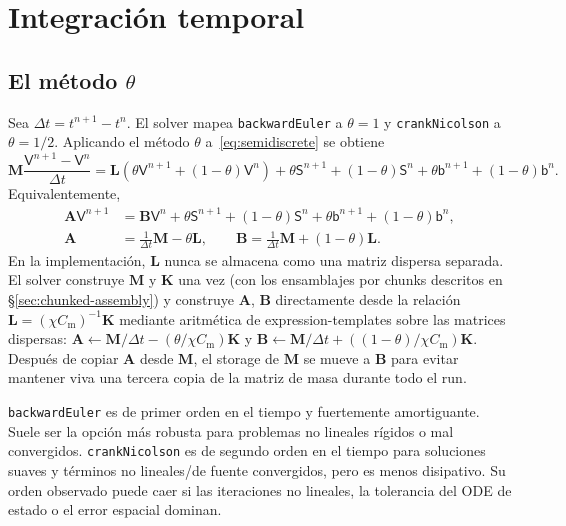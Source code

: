\documentclass[11pt,a4paper]{article}
\newcommand{\code}[1]{\texttt{\small #1}}
\newcommand{\Mmass}{\mathbf{M}}
\newcommand{\Kstif}{\mathbf{K}}
\newcommand{\Lop}{\mathbf{L}}
\newcommand{\Aimp}{\mathbf{A}}
\newcommand{\Bimp}{\mathbf{B}}
\begin{document}
\section{Integración temporal}

\subsection{El método \texorpdfstring{$\theta$}{theta}}

Sea $\Delta t=t^{n+1}-t^n$. El solver mapea \code{backwardEuler} a $\theta=1$ y
\code{crankNicolson} a $\theta=1/2$. Aplicando el método $\theta$ a~\eqref{eq:semidiscrete}
se obtiene
\begin{equation}
  \Mmass\frac{\mathsf{V}^{n+1}-\mathsf{V}^{n}}{\Delta t}
  =
  \Lop\left(\theta\mathsf{V}^{n+1}+(1-\theta)\mathsf{V}^{n}\right)
  +
  \theta\mathsf{S}^{n+1}
  +(1-\theta)\mathsf{S}^{n}
  +\theta\mathsf{b}^{n+1}
  +(1-\theta)\mathsf{b}^{n}.
  \label{eq:theta}
\end{equation}
Equivalentemente,
\begin{align}
  \Aimp \mathsf{V}^{n+1}
  &=
  \Bimp \mathsf{V}^{n}
  +\theta\mathsf{S}^{n+1}
  +(1-\theta)\mathsf{S}^{n}
  +\theta\mathsf{b}^{n+1}
  +(1-\theta)\mathsf{b}^{n},
  \label{eq:implicit-system}\\
  \Aimp &= \frac{1}{\Delta t}\Mmass-\theta\Lop,\qquad
  \Bimp = \frac{1}{\Delta t}\Mmass+(1-\theta)\Lop.
\end{align}
En la implementación, $\Lop$ nunca se almacena como una matriz dispersa separada. El solver
construye $\Mmass$ y $\Kstif$ una vez (con los ensamblajes por chunks descritos en
\S\ref{sec:chunked-assembly}) y construye $\Aimp$, $\Bimp$ directamente desde la relación
$\Lop=(\chi C_{\text{m}})^{-1}\Kstif$ mediante aritmética de expression-templates sobre las matrices
dispersas: $\Aimp\leftarrow\Mmass/\Delta t-(\theta/\chi C_{\text{m}})\Kstif$ y
$\Bimp\leftarrow\Mmass/\Delta t+((1-\theta)/\chi C_{\text{m}})\Kstif$. Después de copiar $\Aimp$ desde
$\Mmass$, el storage de $\Mmass$ se mueve a $\Bimp$ para evitar mantener viva una tercera
copia de la matriz de masa durante todo el run.

\code{backwardEuler} es de primer orden en el tiempo y fuertemente amortiguante. Suele ser
la opción más robusta para problemas no lineales rígidos o mal convergidos.
\code{crankNicolson} es de segundo orden en el tiempo para soluciones suaves y términos no
lineales/de fuente convergidos, pero es menos disipativo. Su orden observado puede caer si
las iteraciones no lineales, la tolerancia del ODE de estado o el error espacial dominan.
\end{document}
